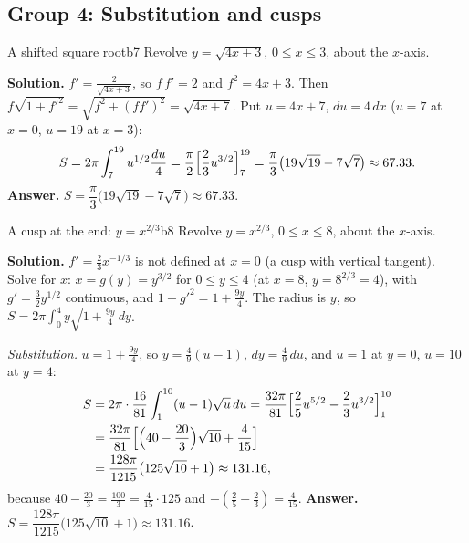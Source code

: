 \documentclass[11pt]{article}
\begin{document}
\subsection*{Group 4: Substitution and cusps}

\begin{exmp}{A shifted square root}{b7}
Revolve $y=\sqrt{4x+3}$, $0\le x\le3$, about the $x$-axis.

\textbf{Solution.} $f'=\frac2{\sqrt{4x+3}}$, so $f\,f'=2$ and $f^2=4x+3$. Then $f\sqrt{1+f'^2}=\sqrt{f^2+(ff')^2}=\sqrt{4x+7}$. Put $u=4x+7$, $du=4\,dx$ ($u=7$ at $x=0$, $u=19$ at $x=3$):
\[
S=2\pi\int_7^{19}u^{1/2}\frac{du}4=\frac\pi2\Bigl[\frac23u^{3/2}\Bigr]_7^{19}=\frac\pi3\bigl(19\sqrt{19}-7\sqrt7\bigr)\approx67.33 .
\]
\textbf{Answer.} $S=\dfrac\pi3\bigl(19\sqrt{19}-7\sqrt7\bigr)\approx67.33$.
\end{exmp}

\begin{exmp}{A cusp at the end: $y=x^{2/3}$}{b8}
Revolve $y=x^{2/3}$, $0\le x\le8$, about the $x$-axis.

\textbf{Solution.} $f'=\frac23x^{-1/3}$ is not defined at $x=0$ (a cusp with vertical tangent). Solve for $x$: $x=g(y)=y^{3/2}$ for $0\le y\le4$ (at $x=8$, $y=8^{2/3}=4$), with $g'=\frac32y^{1/2}$ continuous, and $1+g'^2=1+\frac{9y}4$. The radius is $y$, so $S=2\pi\int_0^4y\sqrt{1+\frac{9y}4}\,dy$.

\emph{Substitution.} $u=1+\frac{9y}4$, so $y=\frac49(u-1)$, $dy=\frac49\,du$, and $u=1$ at $y=0$, $u=10$ at $y=4$:
\[
\begin{aligned}
S&=2\pi\cdot\frac{16}{81}\int_1^{10}(u-1)\sqrt u\,du=\frac{32\pi}{81}\Bigl[\frac25u^{5/2}-\frac23u^{3/2}\Bigr]_1^{10}\\
&=\frac{32\pi}{81}\Bigl[\Bigl(40-\frac{20}3\Bigr)\sqrt{10}+\frac4{15}\Bigr]\\
&=\frac{128\pi}{1215}\bigl(125\sqrt{10}+1\bigr)\approx131.16 ,
\end{aligned}
\]
because $40-\frac{20}3=\frac{100}3=\frac4{15}\cdot125$ and $-(\frac25-\frac23)=\frac4{15}$.
\textbf{Answer.} $S=\dfrac{128\pi}{1215}\bigl(125\sqrt{10}+1\bigr)\approx131.16$.
\end{exmp}
\end{document}
